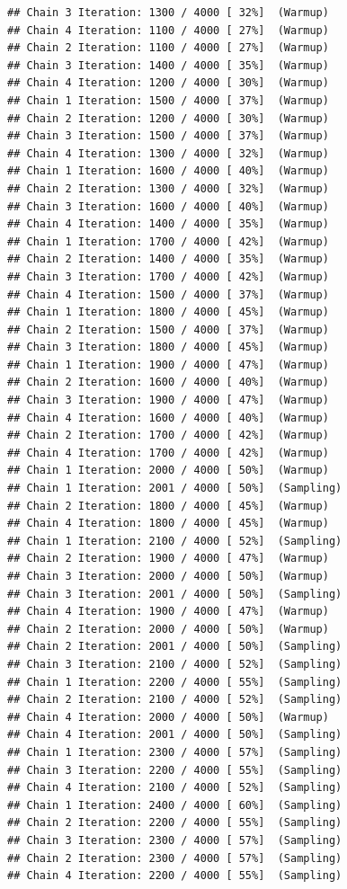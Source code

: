 \documentclass[
]{article}
\begin{document}
\begin{verbatim}
## Chain 3 Iteration: 1300 / 4000 [ 32%]  (Warmup) 
## Chain 4 Iteration: 1100 / 4000 [ 27%]  (Warmup) 
## Chain 2 Iteration: 1100 / 4000 [ 27%]  (Warmup) 
## Chain 3 Iteration: 1400 / 4000 [ 35%]  (Warmup) 
## Chain 4 Iteration: 1200 / 4000 [ 30%]  (Warmup) 
## Chain 1 Iteration: 1500 / 4000 [ 37%]  (Warmup) 
## Chain 2 Iteration: 1200 / 4000 [ 30%]  (Warmup) 
## Chain 3 Iteration: 1500 / 4000 [ 37%]  (Warmup) 
## Chain 4 Iteration: 1300 / 4000 [ 32%]  (Warmup) 
## Chain 1 Iteration: 1600 / 4000 [ 40%]  (Warmup) 
## Chain 2 Iteration: 1300 / 4000 [ 32%]  (Warmup) 
## Chain 3 Iteration: 1600 / 4000 [ 40%]  (Warmup) 
## Chain 4 Iteration: 1400 / 4000 [ 35%]  (Warmup) 
## Chain 1 Iteration: 1700 / 4000 [ 42%]  (Warmup) 
## Chain 2 Iteration: 1400 / 4000 [ 35%]  (Warmup) 
## Chain 3 Iteration: 1700 / 4000 [ 42%]  (Warmup) 
## Chain 4 Iteration: 1500 / 4000 [ 37%]  (Warmup) 
## Chain 1 Iteration: 1800 / 4000 [ 45%]  (Warmup) 
## Chain 2 Iteration: 1500 / 4000 [ 37%]  (Warmup) 
## Chain 3 Iteration: 1800 / 4000 [ 45%]  (Warmup) 
## Chain 1 Iteration: 1900 / 4000 [ 47%]  (Warmup) 
## Chain 2 Iteration: 1600 / 4000 [ 40%]  (Warmup) 
## Chain 3 Iteration: 1900 / 4000 [ 47%]  (Warmup) 
## Chain 4 Iteration: 1600 / 4000 [ 40%]  (Warmup) 
## Chain 2 Iteration: 1700 / 4000 [ 42%]  (Warmup) 
## Chain 4 Iteration: 1700 / 4000 [ 42%]  (Warmup) 
## Chain 1 Iteration: 2000 / 4000 [ 50%]  (Warmup) 
## Chain 1 Iteration: 2001 / 4000 [ 50%]  (Sampling) 
## Chain 2 Iteration: 1800 / 4000 [ 45%]  (Warmup) 
## Chain 4 Iteration: 1800 / 4000 [ 45%]  (Warmup) 
## Chain 1 Iteration: 2100 / 4000 [ 52%]  (Sampling) 
## Chain 2 Iteration: 1900 / 4000 [ 47%]  (Warmup) 
## Chain 3 Iteration: 2000 / 4000 [ 50%]  (Warmup) 
## Chain 3 Iteration: 2001 / 4000 [ 50%]  (Sampling) 
## Chain 4 Iteration: 1900 / 4000 [ 47%]  (Warmup) 
## Chain 2 Iteration: 2000 / 4000 [ 50%]  (Warmup) 
## Chain 2 Iteration: 2001 / 4000 [ 50%]  (Sampling) 
## Chain 3 Iteration: 2100 / 4000 [ 52%]  (Sampling) 
## Chain 1 Iteration: 2200 / 4000 [ 55%]  (Sampling) 
## Chain 2 Iteration: 2100 / 4000 [ 52%]  (Sampling) 
## Chain 4 Iteration: 2000 / 4000 [ 50%]  (Warmup) 
## Chain 4 Iteration: 2001 / 4000 [ 50%]  (Sampling) 
## Chain 1 Iteration: 2300 / 4000 [ 57%]  (Sampling) 
## Chain 3 Iteration: 2200 / 4000 [ 55%]  (Sampling) 
## Chain 4 Iteration: 2100 / 4000 [ 52%]  (Sampling) 
## Chain 1 Iteration: 2400 / 4000 [ 60%]  (Sampling) 
## Chain 2 Iteration: 2200 / 4000 [ 55%]  (Sampling) 
## Chain 3 Iteration: 2300 / 4000 [ 57%]  (Sampling) 
## Chain 2 Iteration: 2300 / 4000 [ 57%]  (Sampling) 
## Chain 4 Iteration: 2200 / 4000 [ 55%]  (Sampling) 

\end{verbatim}
\end{document}
